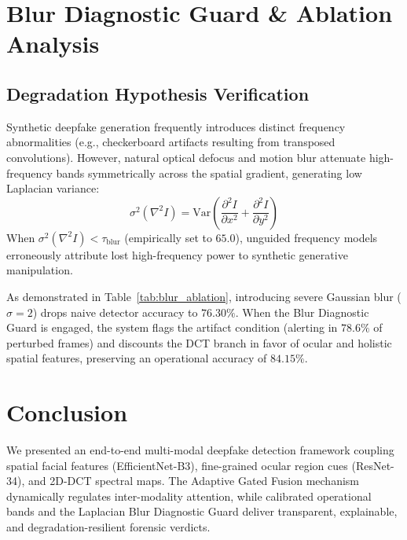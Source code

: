 \documentclass[journal,10pt,twocolumn]{IEEEtran}
\begin{document}
\section{Blur Diagnostic Guard \& Ablation Analysis}
\subsection{Degradation Hypothesis Verification}
Synthetic deepfake generation frequently introduces distinct frequency abnormalities (e.g., checkerboard artifacts resulting from transposed convolutions). However, natural optical defocus and motion blur attenuate high-frequency bands symmetrically across the spatial gradient, generating low Laplacian variance:
\begin{equation}
    \sigma^2(\nabla^2 I) = \text{Var}\left( \frac{\partial^2 I}{\partial x^2} + \frac{\partial^2 I}{\partial y^2} \right)
\end{equation}
When $\sigma^2(\nabla^2 I) < \tau_{\text{blur}}$ (empirically set to $65.0$), unguided frequency models erroneously attribute lost high-frequency power to synthetic generative manipulation. 

As demonstrated in Table~\ref{tab:blur_ablation}, introducing severe Gaussian blur ($\sigma=2$) drops naive detector accuracy to $76.30\%$. When the Blur Diagnostic Guard is engaged, the system flags the artifact condition (alerting in $78.6\%$ of perturbed frames) and discounts the DCT branch in favor of ocular and holistic spatial features, preserving an operational accuracy of $84.15\%$.

\section{Conclusion}
We presented an end-to-end multi-modal deepfake detection framework coupling spatial facial features (EfficientNet-B3), fine-grained ocular region cues (ResNet-34), and 2D-DCT spectral maps. The Adaptive Gated Fusion mechanism dynamically regulates inter-modality attention, while calibrated operational bands and the Laplacian Blur Diagnostic Guard deliver transparent, explainable, and degradation-resilient forensic verdicts.
\end{document}
